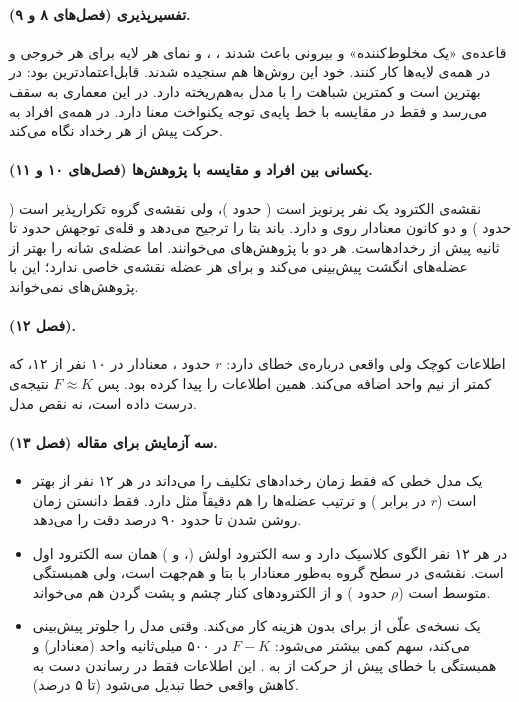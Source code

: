 \paragraph{تفسیرپذیری (فصل‌های ۸ و ۹).} قاعده‌ی «یک مخلوط‌کننده» و  بیرونی باعث شدند ، ،  و نمای هر لایه برای هر خروجی و در همه‌ی لایه‌ها کار کنند. خود این روش‌ها هم سنجیده شدند.  قابل‌اعتمادترین بود: در  بهترین است و کمترین شباهت را با مدل به‌هم‌ریخته دارد.  در این معماری به سقف می‌رسد و فقط در مقایسه با خط پایه‌ی توجه یکنواخت معنا دارد.  در همه‌ی افراد به حرکت پیش از هر رخداد نگاه می‌کند.

\paragraph{یکسانی بین افراد و مقایسه با پژوهش‌ها (فصل‌های ۱۰ و ۱۱).} نقشه‌ی الکترود یک نفر پرنویز است ( حدود )، ولی نقشه‌ی گروه تکرارپذیر است ( حدود ) و دو کانون معنادار روی  و  دارد.  باند بتا را ترجیح می‌دهد و قله‌ی توجهش حدود  تا  ثانیه پیش از رخدادهاست. هر دو با پژوهش‌های  می‌خوانند. اما  عضله‌ی شانه را بهتر از عضله‌های انگشت پیش‌بینی می‌کند و برای هر عضله نقشه‌ی خاصی ندارد؛ این با پژوهش‌های  نمی‌خواند.

\paragraph{ (فصل ۱۲).}  اطلاعات کوچک ولی واقعی درباره‌ی خطای  دارد: $r$ حدود ، معنادار در ۱۰ نفر از ۱۲، که کمتر از نیم واحد  اضافه می‌کند.  همین اطلاعات را پیدا کرده بود. پس $F\approx K$ نتیجه‌ی درست داده است، نه نقص مدل.

\paragraph{سه آزمایش برای مقاله (فصل ۱۳).}
\begin{itemize}
\item یک مدل خطی که فقط زمان رخدادهای تکلیف را می‌داند در هر ۱۲ نفر از  بهتر است ($r$  در برابر ) و ترتیب عضله‌ها را هم دقیقاً مثل  دارد. فقط دانستن زمان روشن شدن  تا حدود ۹۰ درصد دقت  را می‌دهد.
\item {} در هر ۱۲ نفر الگوی کلاسیک دارد و سه الکترود اولش (،  و ) همان سه الکترود اول  است. نقشه‌ی  در سطح گروه به‌طور معنادار با  بتا و  هم‌جهت است، ولی همبستگی متوسط است ($\rho$ حدود ) و  از الکترودهای کنار چشم و پشت گردن هم می‌خواند.
\item یک نسخه‌ی علّی از  برای  بدون هزینه کار می‌کند. وقتی مدل  را جلوتر پیش‌بینی می‌کند، سهم  کمی بیشتر می‌شود: $F-K$ در ۵۰۰ میلی‌ثانیه  واحد  (معنادار) و همبستگی  با خطای  پیش از حرکت از  به . این اطلاعات فقط در رساندن دست به کاهش واقعی خطا تبدیل می‌شود (تا ۵ درصد).
\end{itemize}

